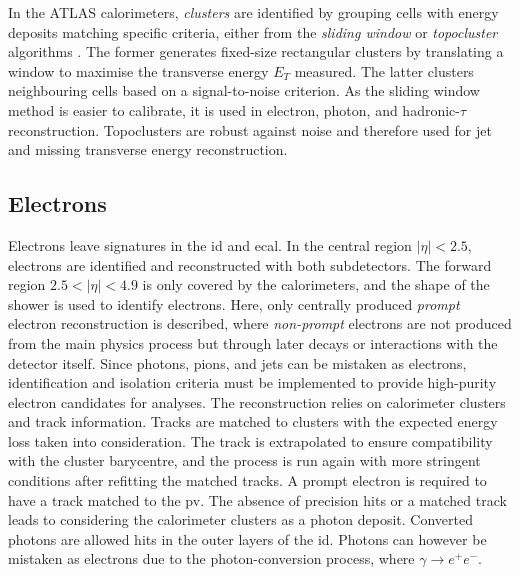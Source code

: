 In the ATLAS calorimeters, \textit{clusters} are identified by grouping cells with energy deposits matching specific criteria, either from the \textit{sliding window} or \textit{topocluster} algorithms \cite{Lampl:1099735}. The former generates fixed-size rectangular clusters by translating a window to maximise the transverse energy $E_T$ measured. The latter clusters neighbouring cells based on a signal-to-noise criterion. As the sliding window method is easier to calibrate, it is used in electron, photon, and hadronic-$\tau$ reconstruction. Topoclusters are robust against noise and therefore used for jet and missing transverse energy reconstruction.

\subsection{Electrons}\label{sec-atlas-el}
Electrons leave signatures in the \gls{id} and \gls{ecal}. In the central region $|\eta| < 2.5$, electrons are identified and reconstructed with both subdetectors. The forward region $2.5 < |\eta| < 4.9$ is only covered by the calorimeters, and the shape of the shower is used to identify electrons. Here, only centrally produced \textit{prompt} electron reconstruction is described, where \textit{non-prompt} electrons are not produced from the main physics process but through later decays or interactions with the detector itself. Since photons, pions, and jets can be mistaken as electrons, identification and isolation criteria must be implemented to provide high-purity electron candidates for analyses. The reconstruction relies on calorimeter clusters and track information. Tracks are matched to clusters with the expected energy loss taken into consideration. The track is extrapolated to ensure compatibility with the cluster barycentre, and the process is run again with more stringent conditions after refitting the matched tracks. A prompt electron is required to have a track matched to the \gls{pv}. The absence of precision hits or a matched track leads to considering the calorimeter clusters as a photon deposit. Converted photons are allowed hits in the outer layers of the \gls{id}. Photons can however be mistaken as electrons due to the photon-conversion process, where $\gamma \rightarrow e^+e^-$. \\

